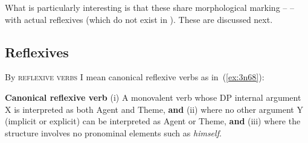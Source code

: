 \begin{exe}
\begin{xlist}
\begin{xlist}
\begin{exe}
\begin{xlist}
\begin{xlist}
\begin{exe}
\begin{xlist}
\begin{xlist}
\begin{exe}
\begin{exe}
\begin{xlist}
\begin{exe}
\begin{exe}
\begin{xlist}
\begin{exe}
\begin{exe}
\begin{exe}
\begin{exe}
\begin{exe}
\begin{xlist}
\begin{exe}
\begin{xlist}
\begin{exe}
\begin{exe}
\begin{xlist}
\begin{exe}
\begin{xlist}
\begin{exe}
\begin{xlist}
\begin{exe}
\begin{exe}
\begin{exe}
\begin{xlist}
\begin{exe}
\begin{exe}
\begin{exe}
\begin{xlist}
\begin{exe}
\begin{xlist}
\begin{exe}
\begin{xlist}
\begin{exe}
\begin{xlist}
\begin{exe}
\begin{exe}
\begin{exe}
\begin{exe}
\begin{xlist}
\begin{exe}
\begin{xlist}
\begin{exe}
\begin{xlist}
\begin{exe}
\begin{xlist}
\begin{exe}
\begin{xlist}
\begin{exe}
\begin{xlist}
\begin{exe}
\begin{exe}
\begin{exe}
\begin{exe}
\begin{xlist}
\begin{exe}
\begin{xlist}
\begin{exe}
\begin{xlist}
\begin{exe}
\begin{exe}
\begin{xlist}
\begin{exe}
\begin{xlist}
\begin{exe}
\begin{exe}
\begin{exe}
\begin{exe}
\begin{xlist}
\begin{xlist}
\begin{exe}
\begin{xlist}
\begin{exe}
\begin{exe}
\begin{exe}
\begin{xlist}
\begin{exe}
\begin{exe}
\begin{xlist}
		
 \z
\z 

What is particularly interesting is that these  share morphological marking -- \thit -- with actual reflexives (which do not exist in {\tnif}). These are discussed next.

	\subsection{Reflexives} \label{vz:thit:refl}
By \textsc{reflexive verbs} I mean canonical reflexive verbs as in~(\ref{ex:3n68}):
 \begin{exe}
\ex  \label{ex:3n68}\textbf{Canonical reflexive verb} 
	(i) A monovalent verb whose DP internal argument X is interpreted as both Agent and Theme, \textbf{and} (ii) where no other argument Y (implicit or explicit) can be interpreted as Agent or Theme, \textbf{and} (iii) where the structure involves no pronominal elements such as \emph{himself}.
 \z 


\end{exe}
\end{xlist}
\end{exe}
\end{exe}
\end{xlist}
\end{exe}
\end{exe}
\end{exe}
\end{xlist}
\end{exe}
\end{xlist}
\end{xlist}
\end{exe}
\end{exe}
\end{exe}
\end{exe}
\end{xlist}
\end{exe}
\end{xlist}
\end{exe}
\end{exe}
\end{xlist}
\end{exe}
\end{xlist}
\end{exe}
\end{xlist}
\end{exe}
\end{exe}
\end{exe}
\end{exe}
\end{xlist}
\end{exe}
\end{xlist}
\end{exe}
\end{xlist}
\end{exe}
\end{xlist}
\end{exe}
\end{xlist}
\end{exe}
\end{xlist}
\end{exe}
\end{exe}
\end{exe}
\end{exe}
\end{xlist}
\end{exe}
\end{xlist}
\end{exe}
\end{xlist}
\end{exe}
\end{xlist}
\end{exe}
\end{exe}
\end{exe}
\end{xlist}
\end{exe}
\end{exe}
\end{exe}
\end{xlist}
\end{exe}
\end{xlist}
\end{exe}
\end{xlist}
\end{exe}
\end{exe}
\end{xlist}
\end{exe}
\end{xlist}
\end{exe}
\end{exe}
\end{exe}
\end{exe}
\end{exe}
\end{xlist}
\end{exe}
\end{exe}
\end{xlist}
\end{exe}
\end{exe}
\end{xlist}
\end{xlist}
\end{exe}
\end{xlist}
\end{xlist}
\end{exe}
\end{xlist}
\end{xlist}
\end{exe}
